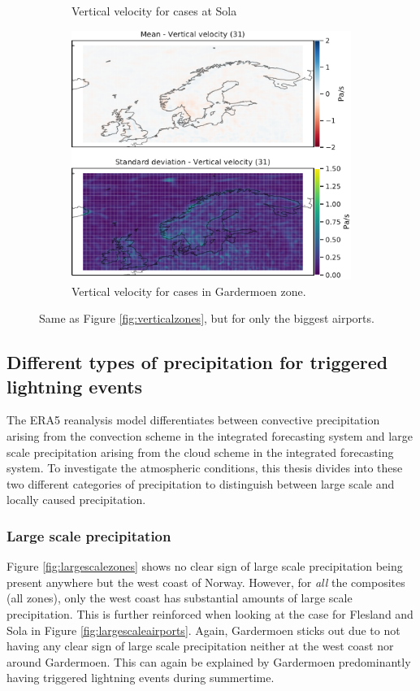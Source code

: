 \begin{figure}
\begin{subfigure}[b]{0.49\textwidth}
         \caption{Vertical velocity for cases at Sola}
         \label{fig:ENZVW}
     \end{subfigure}
    \begin{subfigure}[b]{0.5\textwidth}
    \centering
    \includegraphics[width=\textwidth]{Figures/WENGM.pdf}
    \caption{Vertical velocity for cases in Gardermoen zone.}
    \label{fig:ENGMW}
\end{subfigure}
\caption{Same as Figure \ref{fig:verticalzones}, but for only the biggest airports.}
\label{fig:verticalairports}
\end{figure}


\subsection{Different types of precipitation for triggered lightning events}
The ERA5 reanalysis model differentiates between convective precipitation arising from the convection scheme in the integrated forecasting system and large scale precipitation arising from the cloud scheme in the integrated forecasting system. To investigate the atmospheric conditions, this thesis divides into these two different categories of precipitation to distinguish between large scale and locally caused precipitation.

\subsubsection{Large scale precipitation}
Figure \ref{fig:largescalezones} shows no clear sign of large scale precipitation being present anywhere but the west coast of Norway. However, for \textit{all} the composites (all zones), only the west coast has substantial amounts of large scale precipitation. This is further reinforced when looking at the case for Flesland and Sola in Figure \ref{fig:largescaleairports}. Again, Gardermoen sticks out due to not having any clear sign of large scale precipitation neither at the west coast nor around Gardermoen. This can again be explained by Gardermoen predominantly having triggered lightning events during summertime.

